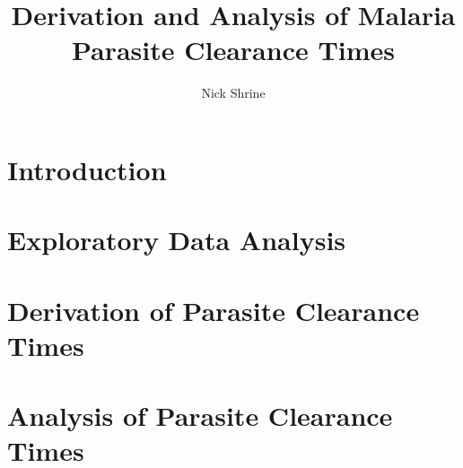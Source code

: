 \documentclass[11pt,a4paper]{report}
\begin{document}
\title{Derivation and Analysis of Malaria Parasite Clearance Times}
\author{Nick Shrine}
\maketitle
\chapter{Introduction}
\chapter{Exploratory Data Analysis}

\chapter{Derivation of Parasite Clearance Times}

\chapter{Analysis of Parasite Clearance Times}
 

\end{document}
